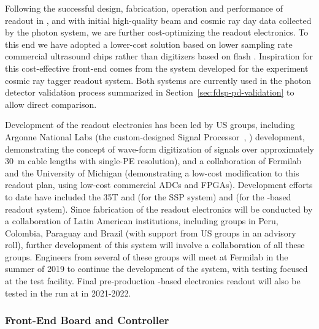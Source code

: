 Following the successful design, fabrication, operation and performance of  readout in , and with initial high-quality beam and cosmic ray day data collected by the  photon system, we are
further cost-optimizing the readout electronics.  To this end we have adopted a lower-cost solution based on lower sampling rate commercial ultrasound  chips rather than digitizers based on flash . Inspiration for this cost-effective front-end comes from the system developed for the  experiment cosmic ray tagger readout system.
Both systems are currently used in the photon detector validation process summarized in Section~\ref{sec:fdsp-pd-validation} to allow direct comparison.


Development of the readout electronics has been led by US groups, including Argonne National Labs (the custom-designed  Signal Processor~, ) development, demonstrating the concept of wave-form digitization of  signals over approximately \SI{30}{m} cable lengths with single-PE resolution), and a collaboration of Fermilab and the University of Michigan (demonstrating a low-cost modification to this readout plan, using low-cost commercial ADCs and FPGAs).  Development efforts to date have included the 35T and  (for the SSP system) and  (for the -based readout system).  Since fabrication of the readout electronics will be conducted by a collaboration of Latin American institutions, including groups in Peru, Colombia, Paraguay and Brazil (with support from US groups in an advisory roll), further development of this system will involve a collaboration of all these groups.  Engineers from several of these groups will meet at Fermilab in the summer of 2019 to continue the development of the system, with testing focused at the  test facility.  Final pre-production -based electronics readout will also be tested in the  run at  in 2021-2022.

\subsubsection{Front-End Board and Controller}


